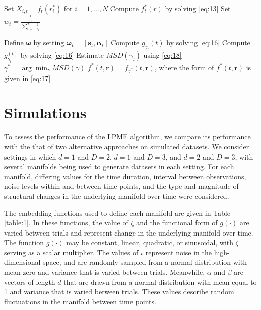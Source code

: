 \documentclass[11pt,reqno]{article}
\theoremstyle{definition}
\begin{document}
\begin{algorithm}
 {
  Set $X_{i, t} = f_t(r_{i}^*)$ for $i = 1, \dots, N$\;
  Compute $f_t^*(r)$ by solving \eqref{eq:13}\;
  Set $w_t = \frac{\frac{1}{\tau_t}}{\sum_{i=1}^{T}\frac{1}{\tau_i}}$\;
}

  Define $\boldsymbol{\omega}$ by setting $\boldsymbol{\omega}_t = \left[\boldsymbol{s}_t, \boldsymbol{\alpha}_t\right]$\;
   {
    Compute $g_{\gamma_l}(t)$ by solving \eqref{eq:16}\;
     {
      Compute $g_{\gamma_l}^{(t)}$ by solving \eqref{eq:16}\;
    }
    Estimate $MSD(\gamma_l)$ using \eqref{eq:18}\;
  }
  $\gamma^* = \arg\min_{\gamma}MSD(\gamma)$\;
  $f^*(t, \boldsymbol{r}) = f_{\gamma^*}(t, \boldsymbol{r})$, where the form of $f^*(t, \boldsymbol{r})$ is given in \eqref{eq:17}
\end{algorithm}

\section{Simulations}

To assess the performance of the LPME algorithm, we compare its performance with the that of two alternative approaches on simulated datasets. We consider settings in which $d = 1$ and $D = 2$, $d = 1$ and $D = 3$, and $d = 2$ and $D = 3$, with several manifolds being used to generate datasets in each setting. For each manifold, differing values for the time duration, interval between observations, noise levels within and between time points, and the type and magnitude of structural changes in the underlying manifold over time were considered. 

The embedding functions used to define each manifold are given in Table \ref{table:1}. In these functions, the value of $\zeta$ and the functional form of $g(\cdot)$ are varied between trials and represent change in the underlying manifold over time. The function $g(\cdot)$ may be constant, linear, quadratic, or sinusoidal, with $\zeta$ serving as a scalar multiplier. The values of $\iota$ represent noise in the high-dimensional space, and are randomly sampled from a normal distribution with mean zero and variance that is varied between trials. Meanwhile, $\alpha$ and $\beta$ are vectors of length $d$ that are drawn from a normal distribution with mean equal to 1 and variance that is varied between trials. These values describe random fluctuations in the manifold between time points.
\end{document}

